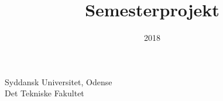 \documentclass[../paper.tex]{subfiles}
\title{Semesterprojekt}
\author{}
\date{2018}
\begin{document}
  \clearpage\maketitle
  \thispagestyle{empty}

  \noindent
  Syddansk Universitet, Odense\\
  Det Tekniske Fakultet\\
  \newpage
\end{document}
